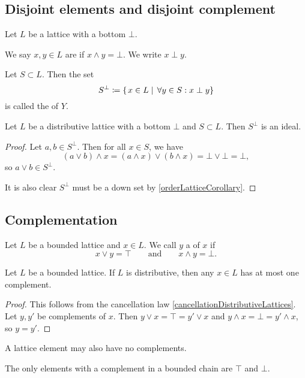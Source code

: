 \subsection{Disjoint elements and disjoint complement}
\begin{definition}
Let $L$ be a lattice with a bottom $\bot$.

We say $x,y\in L$ are  if $x\wedge y = \bot$. We write $x \perp y$.

Let $S\subset L$. Then the set
\[ S^\perp \coloneqq \left\{\left. x\in L \;\right|\; \forall y\in S: x\perp y \right\} \]
is called the  of $Y$.
\end{definition}

\begin{lemma} \label{disjointComplementIdeal}
Let $L$ be a distributive lattice with a bottom $\bot$ and $S\subset L$. Then $S^\perp$ is an ideal.
\end{lemma}
\begin{proof}
Let $a,b\in S^\perp$. Then for all $x\in S$, we have
\[ (a\vee b)\wedge x = (a\wedge x)\vee (b\wedge x) = \bot\vee \bot = \bot, \]
so $a\vee b\in S^\perp$.

It is also clear $S^\perp$ must be a down set by \ref{orderLatticeCorollary}.
\end{proof}

\subsection{Complementation}
\begin{definition}
Let $L$ be a bounded lattice and $x\in L$. We call $y$ a  of $x$ if
\[ x \vee y = \top \qquad \text{and} \qquad x\wedge y = \bot. \]
\end{definition}

\begin{proposition} \label{distributiveComplementUnique}
Let $L$ be a bounded lattice. If $L$ is distributive, then any $x\in L$ has at most one complement.
\end{proposition}
\begin{proof}
This follows from the cancellation law \ref{cancellationDistributiveLattices}. Let $y,y'$ be complements of $x$. Then $y\vee x = \top = y'\vee x$ and $y\wedge x = \bot = y'\wedge x$, so $y=y'$.
\end{proof}

A lattice element may also have no complements.
\begin{example}
The only elements with a complement in a bounded chain are $\top$ and $\bot$.
\end{example}


